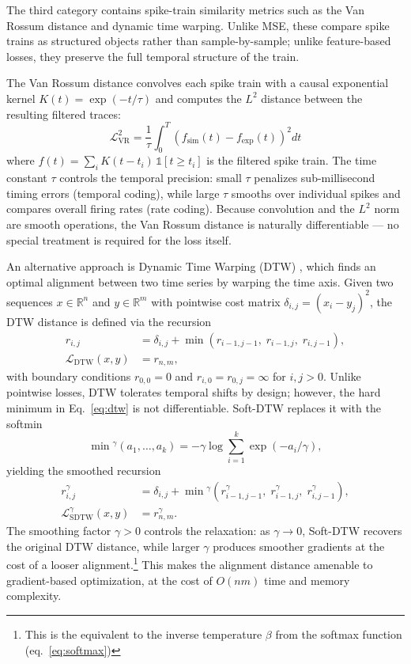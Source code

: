 The third category contains spike-train similarity metrics such as the Van Rossum distance and dynamic time warping.
Unlike MSE, these compare spike trains as structured objects rather than sample-by-sample;
unlike feature-based losses, they preserve the full temporal structure of the train.

The Van Rossum distance \cite{Rossum2001} convolves each spike train with a causal exponential kernel $K(t) = \exp(-t/\tau)$ and computes the $L^2$ distance between the resulting filtered traces:
\begin{equation}\label{eq:van-rossum}
    \mathcal{L}_{\text{VR}}^2 = \frac{1}{\tau} \int_0^T \left( f_{\text{sim}}(t) - f_{\text{exp}}(t) \right)^2 dt
\end{equation}
where $f(t) = \sum_i K(t - t_i)\,\mathds{1}[t\ge t_i]$ is the filtered spike train.
The time constant $\tau$ controls the temporal precision: small $\tau$ penalizes sub-millisecond timing errors (temporal coding),
while large $\tau$ smooths over individual spikes and compares overall firing rates (rate coding).
Because convolution and the $L^2$ norm are smooth operations, the Van Rossum distance is naturally differentiable --- no special treatment is required for the loss itself.

An alternative approach is Dynamic Time Warping (DTW) \cite{Sakoe1978}, which finds an optimal alignment between two time series by warping the time axis.
Given two sequences $x \in \mathbb{R}^n$ and $y \in \mathbb{R}^m$ with pointwise cost matrix $\delta_{i,j} = (x_i - y_j)^2$, the DTW distance is defined via the recursion
\begin{align}\label{eq:dtw}
    r_{i,j} &= \delta_{i,j} + \min\!\left( r_{i-1,j-1},\; r_{i-1,j},\; r_{i,j-1} \right),\nonumber\\
    \mathcal{L}_{\text{DTW}}(x, y) &= r_{n,m},
\end{align}
with boundary conditions $r_{0,0} = 0$ and $r_{i,0} = r_{0,j} = \infty$ for $i, j > 0$.
Unlike pointwise losses, DTW tolerates temporal shifts by design; however, the hard minimum in Eq.~\eqref{eq:dtw} is not differentiable.
Soft-DTW \cite{Blondel2018} replaces it with the softmin
\begin{equation}\label{eq:softmin}
    \min{}^{\gamma}(a_1, \dots, a_k) = -\gamma \log \sum_{i=1}^{k} \exp(-a_i / \gamma),
\end{equation}
yielding the smoothed recursion
\begin{align}\label{eq:soft-dtw}
    r_{i,j}^{\gamma} &= \delta_{i,j} + \min{}^{\gamma}\!\left( r_{i-1,j-1}^{\gamma},\; r_{i-1,j}^{\gamma},\; r_{i,j-1}^{\gamma} \right),\nonumber\\
    \mathcal{L}_{\text{SDTW}}^{\gamma}(x, y) &= r_{n,m}^{\gamma}.
\end{align}
The smoothing factor $\gamma > 0$ controls the relaxation:
as $\gamma \to 0$, Soft-DTW recovers the original DTW distance, while larger $\gamma$ produces smoother gradients at the cost of a looser alignment.\footnote{This is the equivalent to the inverse temperature $\beta$ from the softmax function (eq.~\ref{eq:softmax})}
This makes the alignment distance amenable to gradient-based optimization, at the cost of $O(nm)$ time and memory complexity.

